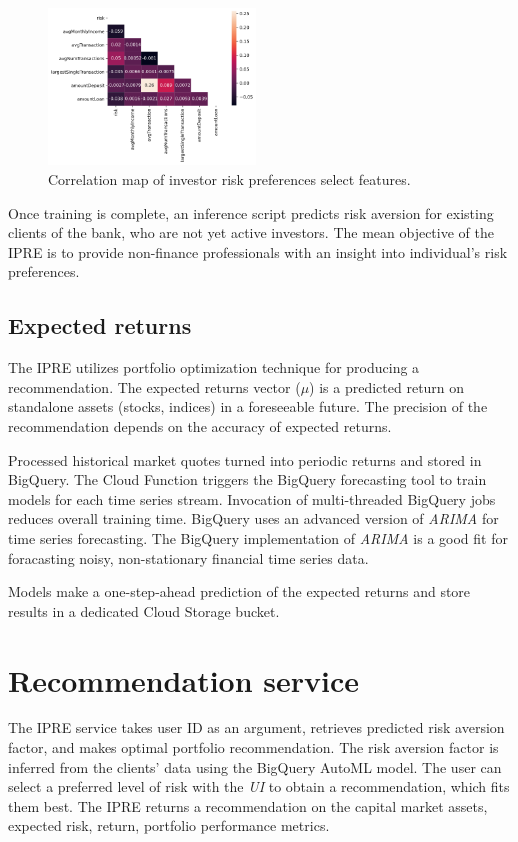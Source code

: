 \documentclass[twocolumn]{article}
\begin{document}
    \begin{figure}
        \includegraphics[width=0.49\textwidth]{media/irp-heatmap.png}
        \caption{Correlation map of investor risk preferences select features.}
    \end{figure}

    Once training is complete, an inference script predicts risk aversion for existing clients of the bank, who are not yet active investors.
    The mean objective of the IPRE is to provide non-finance professionals with an insight into individual's risk preferences.

\subsection{Expected returns}
    The IPRE utilizes portfolio optimization technique for producing a recommendation. 
    The expected returns vector ($\mu$) is a predicted return on standalone assets (stocks, indices) in a foreseeable future.
    The precision of the recommendation depends on the accuracy of expected returns.

    Processed historical market quotes turned into periodic returns and stored in BigQuery.
    The Cloud Function triggers the BigQuery forecasting tool to train models for each time series stream.
    Invocation of multi-threaded BigQuery jobs reduces overall training time.
    BigQuery uses an advanced version of \emph{ARIMA} for time series forecasting.
    The BigQuery implementation of \emph{ARIMA} is a good fit for foracasting noisy, non-stationary financial time series data.

    Models make a one-step-ahead prediction of the expected returns and store results in a dedicated Cloud Storage bucket.

\section{Recommendation service}
    The IPRE service takes user ID as an argument, retrieves predicted risk aversion factor, and makes optimal portfolio recommendation.
    The risk aversion factor is inferred from the clients' data using the BigQuery AutoML model.
    The user can select a preferred level of risk with the \emph{UI} to obtain a recommendation, which fits them best.
    The IPRE returns a recommendation on the capital market assets, expected risk, return, portfolio performance metrics.
\end{document}
